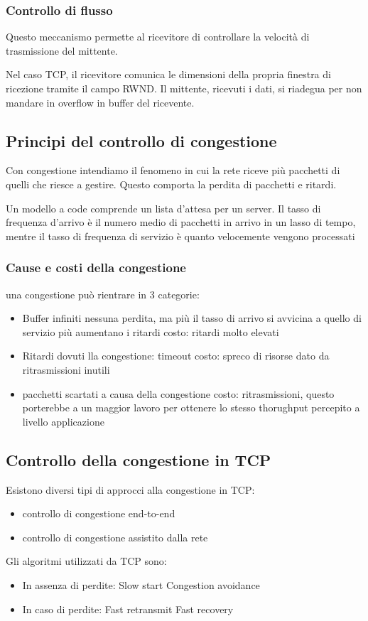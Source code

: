 \documentclass[12pt, a4paper]{article}
\begin{document}
\subsubsection{Controllo di flusso}
Questo meccanismo permette al ricevitore di controllare la velocità di trasmissione del mittente.

Nel caso TCP, il ricevitore comunica le dimensioni della propria finestra di ricezione tramite il campo RWND. 
Il mittente, ricevuti i dati, si riadegua per non mandare in overflow in buffer del ricevente.

\subsection{Principi del controllo di congestione}
Con congestione intendiamo il fenomeno in cui la rete riceve più pacchetti di quelli che riesce a gestire.
Questo comporta la perdita di pacchetti e ritardi.

Un modello a code comprende un lista d'attesa per un server. Il tasso di frequenza d'arrivo è il numero medio
di pacchetti in arrivo in un lasso di tempo, mentre il tasso di frequenza di servizio è quanto velocemente 
vengono processati

\subsubsection{Cause e costi della congestione}
una congestione può rientrare in 3 categorie:
\begin{itemize}
    \item Buffer infiniti
    \subitem  nessuna perdita, ma più il tasso di arrivo si avvicina a quello di servizio più aumentano i ritardi
    \subitem costo: ritardi molto elevati
    \item Ritardi dovuti lla congestione: timeout
    \subitem costo: spreco di risorse dato da ritrasmissioni inutili
    \item pacchetti scartati a causa della congestione
    \subitem costo: ritrasmissioni, questo porterebbe a un maggior lavoro per ottenere lo stesso thorughput percepito
    a livello applicazione
\end{itemize}

\subsection{Controllo della congestione in TCP}
Esistono diversi tipi di approcci alla congestione in TCP:
\begin{itemize}
    \item controllo di congestione end-to-end
    \item controllo di congestione assistito dalla rete
\end{itemize}
Gli algoritmi utilizzati da TCP sono:
\begin{itemize}
    \item In assenza di perdite:
    \subitem Slow start
    \subitem Congestion avoidance
    \item In caso di perdite:
    \subitem Fast retransmit
    \subitem Fast recovery
\end{itemize}
\end{document}
